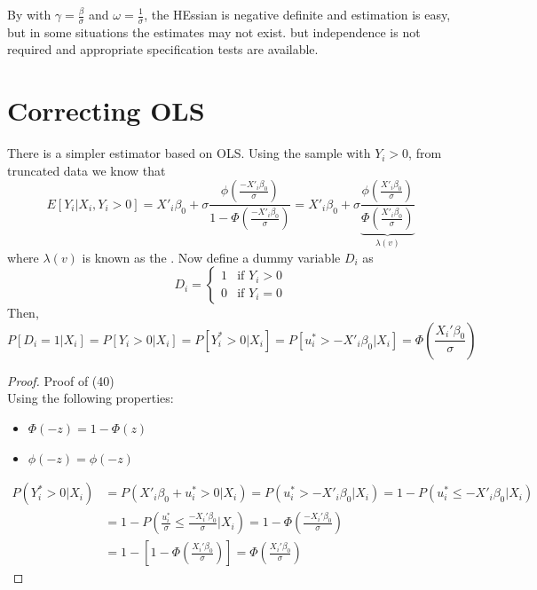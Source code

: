 By  with $\gamma = \frac{\beta}{\sigma}$ and $\omega = \frac{1}{\sigma}$, the HEssian is negative definite and estimation is easy,
but in some situations the estimates may not exist.
 but independence is not required and appropriate specification tests are available.

\section{Correcting OLS}

There is a simpler estimator based on OLS.
Using the sample with $Y_i>0$, from truncated data we know that 
\begin{equation*}
    E[Y_i|X_i, Y_i>0] = X'_i\beta_0 + \sigma\frac{\phi(\frac{-X'_i\beta_0}{\sigma})}{1-\Phi(\frac{-X'_i\beta_0}{\sigma})}
    = X'_i\beta_0 + \sigma\underbrace{\frac{\phi(\frac{X'_i\beta_0}{\sigma})}{\Phi(\frac{X'_i\beta_0}{\sigma})}}_{\lambda(v)}
\end{equation*}
where $\lambda(v)$ is known as the . Now define a dummy variable $D_i$ as 
\begin{equation*}
    D_i = \begin{cases}
        1 & \text{if } Y_i>0\\
        0 & \text{if }Y_i=0
    \end{cases}
\end{equation*}
Then,
\begin{equation}
    P[D_i=1|X_i] = P[Y_i>0|X_i] = P[Y_i^*>0|X_i] = P[u_i^*>-X'_i\beta_0|X_i] = \Phi\left(\frac{X_i'\beta_0}{\sigma}\right)
\end{equation}
\begin{proof}
    Proof of (40)\\
    Using the following properties: \begin{itemize}
        \item $\Phi(-z) = 1-\Phi(z)$
        \item $\phi(-z) = \phi(-z)$
    \end{itemize}
    \begin{align*}
        P(Y_i^*>0|X_i) & = P(X'_i\beta_0+u_i^*>0|X_i) = P(u_i^*>-X'_i\beta_0|X_i) = 1-P(u_i^*\leq -X'_i\beta_0|X_i)\\
        & = 1 - P\left(\frac{u_i^*}{\sigma}\leq\frac{-X_i'\beta_0}{\sigma}|X_i\right) = 1-\Phi\left(\frac{-X_i'\beta_0}{\sigma}\right)\\
        & = 1-\left[1-\Phi\left(\frac{X_i'\beta_0}{\sigma}\right)\right] = \Phi\left(\frac{X_i'\beta_0}{\sigma}\right)
    \end{align*}
\end{proof}

